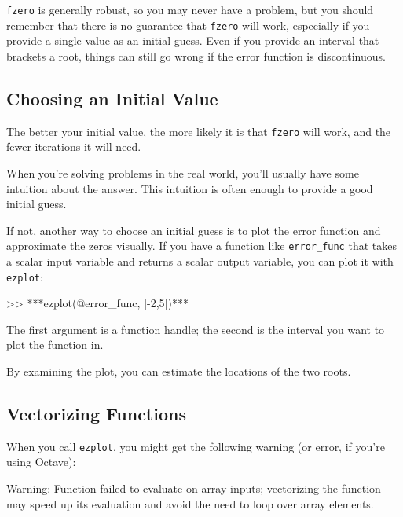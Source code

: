 \lstinline{fzero} is generally robust, so you may never have a problem, but you should remember that there is no guarantee that \lstinline{fzero} will work, especially if you provide a single value as an initial guess.  Even if you provide an interval that brackets a root, things can still go wrong if the error function is discontinuous.


\subsection{Choosing an Initial Value}

The better your initial value, the more likely it is that
\lstinline{fzero} will work, and the fewer iterations it will
need.

When you're solving problems in the real world, you'll usually
have some intuition about the answer.  This intuition is often enough
to provide a good initial guess.


If not, another way to choose an initial guess is to plot the error function and
approximate the zeros visually.  If you have a function like
\lstinline{error_func} that takes a scalar input variable and returns
a scalar output variable, you can plot it with \lstinline{ezplot}:

\begin{code}
>> ***ezplot(@error_func, [-2,5])***
\end{code}

The first argument is a function handle; the second is the interval you want to plot the function in.

By examining the plot, you can estimate the locations of the two roots.


\subsection{Vectorizing Functions}


When you call \lstinline{ezplot}, you might get the following warning (or error, if you're using Octave):

\begin{code}
Warning: Function failed to evaluate on array inputs;
vectorizing the function may speed up its evaluation and 
avoid the need to loop over array elements. 
\end{code}

